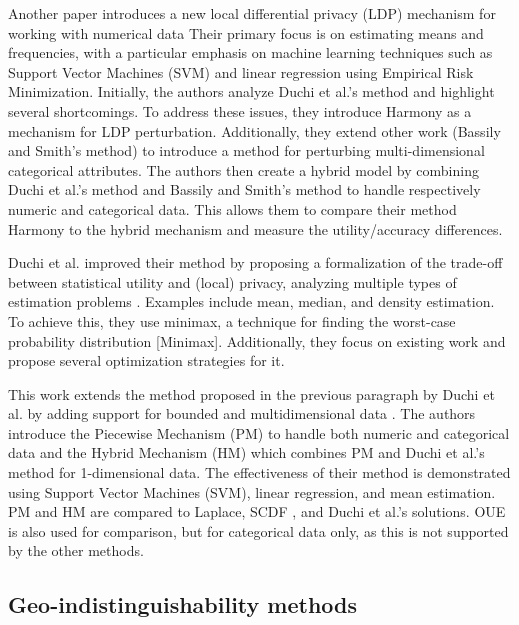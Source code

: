 Another paper introduces a new local differential privacy (LDP) mechanism for working with numerical data \cite{nguyen_collecting_2016}
Their primary focus is on estimating means and frequencies, with a particular emphasis on machine learning techniques such as Support Vector Machines (SVM) and linear regression using Empirical Risk Minimization.
Initially, the authors analyze Duchi et al.'s method \citep{duchi_privacy_2013} and highlight several shortcomings.
To address these issues, they introduce Harmony as a mechanism for LDP perturbation. Additionally, they extend other work (Bassily and Smith's method) to introduce a method for perturbing multi-dimensional categorical attributes.
The authors then create a hybrid model by combining Duchi et al.'s method and Bassily and Smith's method to handle respectively numeric and categorical data. This allows them to compare their method Harmony to the hybrid mechanism and measure the utility/accuracy differences.

Duchi et al. improved their method by proposing a formalization of the trade-off between statistical utility and (local) privacy, analyzing multiple types of estimation problems \citep{duchi_minimax_2017}.
Examples include mean, median, and density estimation.
To achieve this, they use minimax, a technique for finding the worst-case probability distribution [Minimax].
Additionally, they focus on existing work and propose several optimization strategies for it.

This work extends the method proposed in the previous paragraph by Duchi et al. by adding support for bounded and multidimensional data \citep{wang_collecting_2019}.
The authors introduce the Piecewise Mechanism (PM) to handle both numeric and categorical data and the Hybrid Mechanism (HM) which combines PM and Duchi et al.'s method for 1-dimensional data.
The effectiveness of their method is demonstrated using Support Vector Machines (SVM), linear regression, and mean estimation.
PM and HM are compared to Laplace, SCDF , and Duchi et al.'s solutions.
OUE  is also used for comparison, but for categorical data only, as this is not supported by the other methods.

\subsection{Geo-indistinguishability methods}
